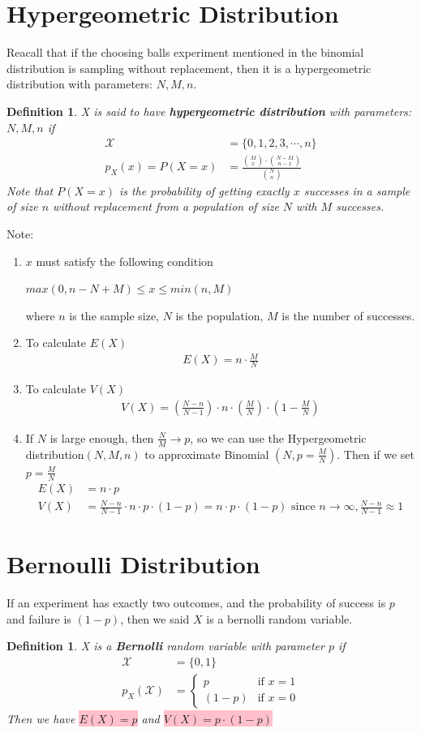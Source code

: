 \documentclass[11pt,oneside]{book}
\theoremstyle{newStyle}
\newtheorem{defn}[thm]{Definition}
\newcommand{\X}{\mathcal{X}}
\newcommand{\note}{\color{red}Note: \color{black}}
\begin{document}
\section[Hypergeometric Distribution]{Hypergeometric Distribution}
Reacall that if the choosing balls experiment mentioned in the binomial distribution is sampling without replacement, then it is a hypergeometric distribution with parameters: $N,M,n$.
\begin{defn}
X is said to have \textbf{hypergeometric distribution} with parameters:  $N,M,n$ if \begin{align*}
\X&=\{0,1,2,3,\cdots,n\}\\
p_X(x)=P(X=x)&=\frac{\binom Mx \cdot \binom{N-M}{n-x}}{\binom Nn}
\end{align*} 
Note that $P(X=x)$ is the probability of getting exactly $x$ successes in a sample of size $n$ without replacement from a population of size $N$ with $M$ successes.
\end{defn}
\note \begin{enumerate}
\item $x$ must satisfy the following condition \begin{center}
$max(0,n-N+M)\leq x\leq min(n,M)$
\end{center}
where $n$ is the sample size, $N$ is the population, $M$ is the number of successes. 
\item To calculate $E(X)$\begin{align*}
E(X)=n\cdot \frac{M}{N}
\end{align*}
\item To calculate $V(X)$\begin{align*}
V(X)=\left(\frac{N-n}{N-1} \right)\cdot n\cdot \left(\frac{M}{N}\right)\cdot \left(1-\frac{M}{N} \right)
\end{align*}
\item If $N$ is large enough, then $\frac{N}{M}\to p$, so we can use the Hypergeometric distribution$(N,M,n)$ to approximate Binomial $(N,p=\frac{M}{N})$. Then if we set $p=\frac{M}{N}$ \begin{align*}
E(X)&=n\cdot p\\
V(X)&=\frac{N-n}{N-1}\cdot n\cdot p \cdot(1-p)=n\cdot p \cdot(1-p) \text{ since }n\to \infty, \frac{N-n}{N-1}\approx 1
\end{align*}
\end{enumerate}
\section[Bernoulli Distribution]{Bernoulli Distribution}
If an experiment has exactly two outcomes, and the probability of success is $p$ and failure is $(1-p)$, then we said $X$ is a bernolli random variable.\begin{defn}
X is a \textbf{Bernolli} random variable with parameter $p$ if \begin{align*}
\X&=\{0,1\}\\
p_X(\X)&=\begin{cases}
p &\text{if }x=1\\
(1-p) &\text{if }x=0
\end{cases}
\end{align*}
Then we have \colorbox{pink}{$E(X)=p$} and \colorbox{pink}{$V(X)=p\cdot (1-p)$}
\end{defn}
\end{document}
